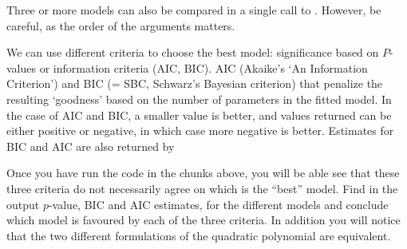 \documentclass[krantz2]{krantz}\usepackage{knitr}%
\begin{document}
\begin{playground}
\begin{knitrout}\footnotesize
{}\color{fgcolor}\begin{kframe}
\begin{alltt}
\end{alltt}
\end{kframe}
\end{knitrout}

Three or more models can also be compared in a single call to . However, be careful, as the order of the arguments matters.

\begin{knitrout}\footnotesize
{}\color{fgcolor}\begin{kframe}
\begin{alltt}
\end{alltt}
\end{kframe}
\end{knitrout}

We can use different criteria to choose the best model: significance based on $P$-values or information criteria (AIC, BIC). AIC (Akaike's ‘An Information Criterion’) and BIC (= SBC, Schwarz's Bayesian criterion) that penalize the resulting `goodness' based on the number of parameters in the fitted model. In the case of AIC and BIC, a smaller value is better, and values returned can be either positive or negative, in which case more negative is better. Estimates for BIC and AIC are also returned by  

\begin{knitrout}\footnotesize
{}\color{fgcolor}\begin{kframe}
\begin{alltt}
\end{alltt}
\end{kframe}
\end{knitrout}

Once you have run the code in the chunks above, you will be able see that these three criteria do not necessarily agree on which is the ``best'' model. Find in the output $p$-value, BIC and AIC estimates, for the different models and conclude which model is favoured by each of the three criteria. In addition you will notice that the two different formulations of the quadratic polynomial are equivalent.

\end{playground}
\end{document}

